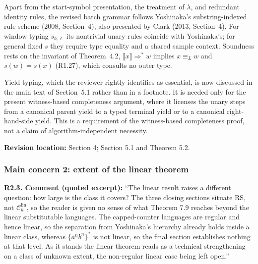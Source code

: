 \documentclass[
  10pt,
  a4paper,
]{article}
\newcommand{\NT}[1]{\llbracket #1\rrbracket}
\begin{document}
Apart from the start-symbol presentation, the treatment of
$\lambda$, and redundant identity rules, the revised batch grammar
follows Yoshinaka's substring-indexed rule scheme (2008, Section~4),
also presented by Clark (2013, Section~4).  For window typing
$s_{k,\ell}$ its nontrivial unary rules coincide with Yoshinaka's;
for general fixed $s$ they require type equality and a shared sample
context. Soundness rests on the invariant of Theorem~4.2,
$\NT{x}\Rightarrow^* w$ implies $x\equiv_L w$ and $s(w)=s(x)$ (R1.27),
which consults no outer type.

Yield typing, which the reviewer rightly identifies as essential, is now
discussed in the main text of Section~5.1 rather than in a footnote. It is
needed only for the present witness-based completeness argument, where it
licenses the unary steps from a canonical parent yield to a typed terminal
yield or to a canonical right-hand-side yield. This is a requirement
of the witness-based completeness proof, not a claim of
algorithm-independent necessity.

\textbf{Revision location:} Section 4; Section 5.1 and Theorem 5.2.

\subsubsection{Main concern 2: extent of the linear
theorem}\label{main-concern-2-extent-of-the-linear-theorem}

\textbf{R2.3. Comment (quoted excerpt):} ``The linear result raises a
different question: how large is the class it covers? The three closing
sections situate RS, not \(\mathcal C_h^{\mathrm{lin}}\), so the reader
is given no sense of what Theorem 7.9 reaches beyond the linear
substitutable languages. The capped-counter languages are regular and
hence
linear, so the separation from Yoshinaka's hierarchy already holds
inside a linear class, whereas \(\{a^n b^n\}^*\) is not linear, so the
final section establishes nothing at that level. As it stands the linear
theorem reads as a technical strengthening on a class of unknown extent,
the non-regular linear case being left open.''
\end{document}

